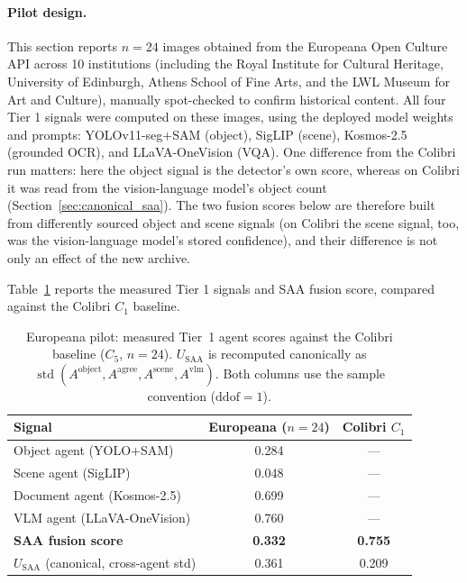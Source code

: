 \documentclass[12pt,a4paper]{report}
\begin{document}
\paragraph{Pilot design.} This section reports $n=24$ images obtained from the Europeana Open Culture API across 10 institutions (including the Royal Institute for Cultural Heritage, University of Edinburgh, Athens School of Fine Arts, and the LWL Museum for Art and Culture), manually spot-checked to confirm historical content. All four Tier 1 signals were computed on these images, using the deployed model weights and prompts: YOLOv11-seg+SAM (object), SigLIP (scene), Kosmos-2.5 (grounded OCR), and LLaVA-OneVision (VQA). One difference from the Colibri run matters: here the object signal is the detector's own score, whereas on Colibri it was read from the vision-language model's object count (Section~\ref{sec:canonical_saa}). The two fusion scores below are therefore built from differently sourced object and scene signals (on Colibri the scene signal, too, was the vision-language model's stored confidence), and their difference is not only an effect of the new archive.

Table~\ref{tab:europeana_real_pilot} reports the measured Tier 1 signals and SAA fusion score, compared against the Colibri $C_1$ baseline.

\begin{table}[!htbp]
\centering
\caption[Europeana pilot: agent scores against Colibri]{Europeana pilot: measured Tier~1 agent scores against the Colibri baseline ($C_5$, $n=24$). $U_{\text{SAA}}$ is recomputed canonically as $\operatorname{std}(A^{\text{object}}, A^{\text{agree}}, A^{\text{scene}}, A^{\text{vlm}})$. Both columns use the sample convention ($\mathrm{ddof}{=}1$).}
\label{tab:europeana_real_pilot}
\begin{tabular}{lcc}
\toprule
\textbf{Signal} & \textbf{Europeana ($n=24$)} & \textbf{Colibri $C_1$} \\
\midrule
Object agent (YOLO+SAM)     & 0.284 & --- \\
Scene agent (SigLIP)        & 0.048 & --- \\
Document agent (Kosmos-2.5) & 0.699 & --- \\
VLM agent (LLaVA-OneVision) & 0.760 & --- \\
\textbf{SAA fusion score}   & \textbf{0.332} & \textbf{0.755} \\
$U_{\text{SAA}}$ (canonical, cross-agent std) & 0.361 & 0.209 \\
\bottomrule
\end{tabular}
\end{table}
\end{document}
